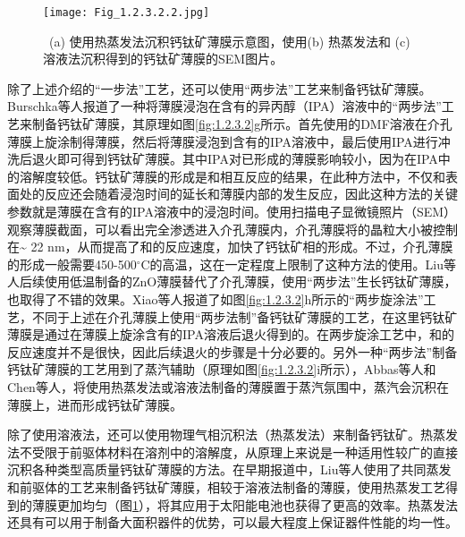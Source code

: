 \documentclass[forlib]{WHUMaster}   %
\begin{document}
{\begin{figure}[ht]
\centering
  \texttt{[image: Fig\_1.2.3.2.2.jpg]}
  \caption{\rm \ (a) 使用热蒸发法沉积钙钛矿薄膜示意图，使用(b) 热蒸发法和 (c) 溶液法沉积得到的钙钛矿薄膜的SEM图片\cite{RN99}。}
  \label{fig:1.2.3.2.2}
\end{figure}

除了上述介绍的“一步法”工艺，还可以使用“两步法”工艺来制备钙钛矿薄膜。Burschka等人报道了一种将薄膜浸泡在含有的异丙醇（IPA）溶液中的“两步法”工艺来制备钙钛矿薄膜\cite{RN97}，其原理如图\ref{fig:1.2.3.2}g所示。首先使用的DMF溶液在介孔薄膜上旋涂制得薄膜，然后将薄膜浸泡到含有的IPA溶液中，最后使用IPA进行冲洗后退火即可得到钙钛矿薄膜。其中IPA对已形成的薄膜影响较小，因为在IPA中的溶解度较低。钙钛矿薄膜的形成是和相互反应的结果，在此种方法中，不仅和表面处的反应还会随着浸泡时间的延长和薄膜内部的发生反应，因此这种方法的关键参数就是薄膜在含有的IPA溶液中的浸泡时间。使用扫描电子显微镜照片（SEM）观察薄膜截面，可以看出完全渗透进入介孔薄膜内，介孔薄膜将的晶粒大小被控制在\~{} 22 nm，从而提高了和的反应速度，加快了钙钛矿相的形成。不过，介孔薄膜的形成一般需要450-500$^{\circ}$C的高温，这在一定程度上限制了这种方法的使用。Liu等人后续使用低温制备的ZnO薄膜替代了介孔薄膜，使用“两步法”生长钙钛矿薄膜，也取得了不错的效果\cite{RN112}。Xiao等人报道了如图\ref{fig:1.2.3.2}h所示的“两步旋涂法”工艺，不同于上述在介孔薄膜上使用“两步法制”备钙钛矿薄膜的工艺，在这里钙钛矿薄膜是通过在薄膜上旋涂含有的IPA溶液后退火得到的\cite{RN19}。在两步旋涂工艺中，和的反应速度并不是很快，因此后续退火的步骤是十分必要的。另外一种“两步法”制备钙钛矿薄膜的工艺用到了蒸汽辅助（原理如图\ref{fig:1.2.3.2}i所示），Abbas等人和Chen等人，将使用热蒸发法或溶液法制备的薄膜置于蒸汽氛围中，蒸汽会沉积在薄膜上，进而形成钙钛矿薄膜\cite{RN116,RN117}。

除了使用溶液法，还可以使用物理气相沉积法（热蒸发法）来制备钙钛矿。热蒸发法不受限于前驱体材料在溶剂中的溶解度，从原理上来说是一种适用性较广的直接沉积各种类型高质量钙钛矿薄膜的方法\cite{RN114}。在早期报道中，Liu等人使用了共同蒸发和前驱体的工艺来制备钙钛矿薄膜，相较于溶液法制备的薄膜，使用热蒸发工艺得到的薄膜更加均匀（图\ref{fig:1.2.3.2.2}），将其应用于太阳能电池也获得了更高的效率\cite{RN99}。热蒸发法还具有可以用于制备大面积器件的优势，可以最大程度上保证器件性能的均一性\cite{RN115}。

}
\end{document}
